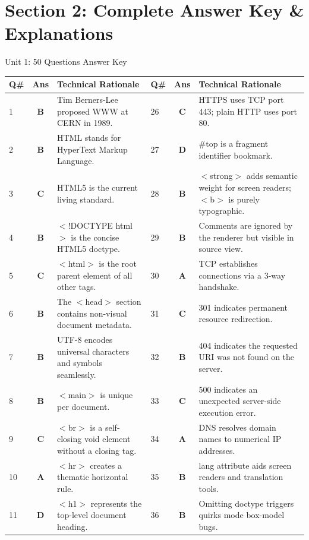 \newpage
\section{Section 2: Complete Answer Key \& Explanations}

\begin{answerkeytable}{Unit 1: 50 Questions Answer Key}
\begin{tabularx}{\textwidth}{l c X l c X}
\toprule
\textbf{Q\#} & \textbf{Ans} & \textbf{Technical Rationale} & \textbf{Q\#} & \textbf{Ans} & \textbf{Technical Rationale} \\
\midrule
1 & \textbf{B} & Tim Berners-Lee proposed WWW at CERN in 1989. & 26 & \textbf{C} & HTTPS uses TCP port 443; plain HTTP uses port 80. \\
2 & \textbf{B} & HTML stands for HyperText Markup Language. & 27 & \textbf{D} & \#top is a fragment identifier bookmark. \\
3 & \textbf{C} & HTML5 is the current living standard. & 28 & \textbf{B} & $<$strong$>$ adds semantic weight for screen readers; $<$b$>$ is purely typographic. \\
4 & \textbf{B} & $<$!DOCTYPE html$>$ is the concise HTML5 doctype. & 29 & \textbf{B} & Comments are ignored by the renderer but visible in source view. \\
5 & \textbf{C} & $<$html$>$ is the root parent element of all other tags. & 30 & \textbf{A} & TCP establishes connections via a 3-way handshake. \\
6 & \textbf{B} & The $<$head$>$ section contains non-visual document metadata. & 31 & \textbf{C} & 301 indicates permanent resource redirection. \\
7 & \textbf{B} & UTF-8 encodes universal characters and symbols seamlessly. & 32 & \textbf{B} & 404 indicates the requested URI was not found on the server. \\
8 & \textbf{B} & $<$main$>$ is unique per document. & 33 & \textbf{C} & 500 indicates an unexpected server-side execution error. \\
9 & \textbf{C} & $<$br$>$ is a self-closing void element without a closing tag. & 34 & \textbf{A} & DNS resolves domain names to numerical IP addresses. \\
10 & \textbf{A} & $<$hr$>$ creates a thematic horizontal rule. & 35 & \textbf{B} & lang attribute aids screen readers and translation tools. \\
11 & \textbf{D} & $<$h1$>$ represents the top-level document heading. & 36 & \textbf{B} & Omitting doctype triggers quirks mode box-model bugs. \\

\end{tabularx}
\end{answerkeytable}
